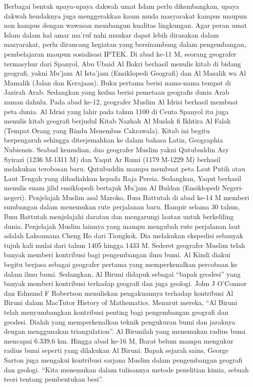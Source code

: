 	Berbagai bentuk upaya-upaya dakwah umat Islam perlu dikembangkan, upaya dakwah hendaknya juga menggerakkan kaum muda masyarakat kampus maupun non kampus dengan wawasan membangun kualitas lingkungan. Agar peran umat Islam dalam hal amar ma’ruf nahi munkar dapat lebih dirasakan dalam masyarakat, perlu dirancang kegiatan yang bersinambung dalam pengembangan, pembelajaran maupun sosialisasi IPTEK. 
	Di abad ke-11 M, seorang geografer termasyhur dari Spanyol, Abu Ubaid Al Bakri berhasil menulis kitab di bidang geografi, yakni Mu’jam Al Ista’jam (Ensiklopedi Geografi) dan Al Masalik wa Al Mamalik (Jalan dan Kerajaan). Buku pertama berisi nama-nama tempat di Jazirah Arab. Sedangkan yang kedua berisi pemetaan geografis dunia Arab zaman dahulu.
	Pada abad ke-12, geografer Muslim Al Idrisi berhasil membuat peta dunia. Al Idrisi yang lahir pada tahun 1100 di Ceuta Spanyol itu juga menulis kitab geografi berjudul Kitab Nazhah Al Muslak fi Ikhtira Al Falak (Tempat Orang yang Rindu Menembus Cakrawala). Kitab ini begitu berpengaruh sehingga diterjemahkan ke dalam bahasa Latin, Geographia Nubiensis.
	Seabad kemudian, dua geografer Muslim yakni Qutubuddin Asy Syirazi (1236 M-1311 M) dan Yaqut Ar Rumi (1179 M-1229 M) berhasil melakukan terobosan baru. Qutubuddin mampu membuat peta Laut Putih atau Laut Tengah yang dihadiahkan kepada Raja Persia. Sedangkan, Yaqut berhasil menulis enam jilid ensiklopedi bertajuk Mu’jam Al Buldan (Ensiklopedi Negeri-negeri).
	Penjelajah Muslim asal Maroko, Ibnu Battutah di abad ke-14 M memberi sumbangan dalam menemukan rute perjalanan baru. Hampir selama 30 tahun, Ibnu Battutah menjelajahi daratan dan mengarungi lautan untuk berkeliling dunia. Penjelajah Muslim lainnya yang mampu mengubah rute perjalanan laut adalah Laksamana Cheng Ho dari Tiongkok. Dia melakukan ekspedisi sebanyak tujuh kali mulai dari tahun 1405 hingga 1433 M.
	Sederet geografer Muslim telah banyak memberi kontribusi bagi pengembangan ilmu bumi. Al Kindi diakui begitu berjasa sebagai geografer pertama yang memperkenalkan percobaan ke dalam ilmu bumi. Sedangkan, Al Biruni didapuk sebagai “bapak geodesi” yang banyak memberi kontribusi terhadap geografi dan juga geologi.
	John J O’Connor dan Edmund F Robertson menuliskan pengakuannya terhadap kontribusi Al Biruni dalam MacTutor History of Mathematics. Menurut mereka, “Al Biruni telah menyumbangkan kontribusi penting bagi pengembangan geografi dan geodesi. Dialah yang memperkenalkan teknik pengukuran bumi dan jaraknya dengan menggunakan triangulation”.
	Al Birunilah yang menemukan radius bumi mencapai 6.339,6 km. Hingga abad ke-16 M, Barat belum mampu mengukur radius bumi seperti yang dilakukan Al Biruni. Bapak sejarah sains, George Sarton juga mengakui kontribusi sarjana Muslim dalam pengembangan geografi dan geologi. “Kita menemukan dalam tulisannya metode penelitian kimia, sebuah teori tentang pembentukan besi”.
